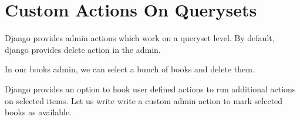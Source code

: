 \documentclass[letterpaper,11pt,english]{sphinxmanual}
\begin{document}
\section{Custom Actions On Querysets}
\label{\detokenize{admin_custom_admin_actions:custom-actions-on-querysets}}
Django provides admin actions which work on a queryset level. By default, django provides delete action in the admin.

In our books admin, we can select a bunch of books and delete them.


Django provides an option to hook user defined actions to run additional actions on selected items. Let us write write a custom admin action to mark selected books as available.

\begin{sphinxVerbatim}[commandchars=\\\{\}]
 
      
        

        
      
\end{sphinxVerbatim}

\end{document}
